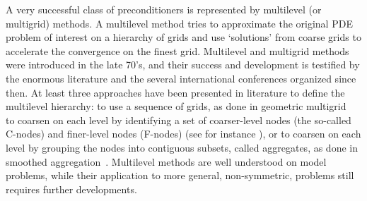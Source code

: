 \documentclass{article}[11pt]
\begin{document}

\smallskip

A very successful class of preconditioners is represented by multilevel (or
multigrid) methods.
A multilevel method tries to approximate
the original PDE problem of interest on a hierarchy of grids and use
`solutions' from coarse grids to accelerate the convergence
on the finest grid.  
Multilevel and multigrid methods were introduced in the late 70's, and their
success and development is testified by the enormous literature and the several
international conferences organized since then. 
At least three
approaches have been presented in literature to define the multilevel
hierarchy:
to use a sequence of grids, as done in geometric multigrid~\cite{brandt.classic,hack.book,hack2.book}
to coarsen on each level by identifying a set of coarser-level nodes
(the so-called C-nodes) and finer-level nodes (F-nodes) 
(see for instance \cite{Briggs,WHackbusch_1985a}), or 
to coarsen on each level by grouping the nodes into contiguous subsets,
called aggregates, as done in smoothed 
aggregation~\cite{vanek1,vanek2,vanek3}.
Multilevel methods are well understood on model problems, while their
application to more general, non-symmetric, problems still requires
further developments.

\smallskip

\end{document}
